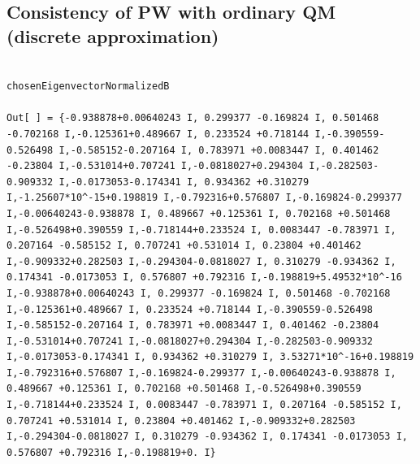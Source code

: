 \subsection{Consistency of PW with ordinary QM (discrete approximation)}

\begin{lstlisting}

chosenEigenvectorNormalizedB 

Out[ ] = {-0.938878+0.00640243 I, 0.299377 -0.169824 I, 0.501468 -0.702168 I,-0.125361+0.489667 I, 0.233524 +0.718144 I,-0.390559-0.526498 I,-0.585152-0.207164 I, 0.783971 +0.0083447 I, 0.401462 -0.23804 I,-0.531014+0.707241 I,-0.0818027+0.294304 I,-0.282503-0.909332 I,-0.0173053-0.174341 I, 0.934362 +0.310279 I,-1.25607*10^-15+0.198819 I,-0.792316+0.576807 I,-0.169824-0.299377 I,-0.00640243-0.938878 I, 0.489667 +0.125361 I, 0.702168 +0.501468 I,-0.526498+0.390559 I,-0.718144+0.233524 I, 0.0083447 -0.783971 I, 0.207164 -0.585152 I, 0.707241 +0.531014 I, 0.23804 +0.401462 I,-0.909332+0.282503 I,-0.294304-0.0818027 I, 0.310279 -0.934362 I, 0.174341 -0.0173053 I, 0.576807 +0.792316 I,-0.198819+5.49532*10^-16 I,-0.938878+0.00640243 I, 0.299377 -0.169824 I, 0.501468 -0.702168 I,-0.125361+0.489667 I, 0.233524 +0.718144 I,-0.390559-0.526498 I,-0.585152-0.207164 I, 0.783971 +0.0083447 I, 0.401462 -0.23804 I,-0.531014+0.707241 I,-0.0818027+0.294304 I,-0.282503-0.909332 I,-0.0173053-0.174341 I, 0.934362 +0.310279 I, 3.53271*10^-16+0.198819 I,-0.792316+0.576807 I,-0.169824-0.299377 I,-0.00640243-0.938878 I, 0.489667 +0.125361 I, 0.702168 +0.501468 I,-0.526498+0.390559 I,-0.718144+0.233524 I, 0.0083447 -0.783971 I, 0.207164 -0.585152 I, 0.707241 +0.531014 I, 0.23804 +0.401462 I,-0.909332+0.282503 I,-0.294304-0.0818027 I, 0.310279 -0.934362 I, 0.174341 -0.0173053 I, 0.576807 +0.792316 I,-0.198819+0. I}


\end{lstlisting}